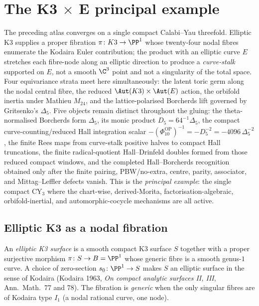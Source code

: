 \section{The K3 $\times$ E principal example}
\label{sec:gluing:k3e}
\label{gluing:part:k3xe-master}
The preceding atlas converges on a single compact
Calabi--Yau threefold. Elliptic K3 supplies a proper fibration $\pi
\colon K3 \to \PP^1$ whose twenty-four nodal fibres enumerate the
Kodaira Euler contribution; the product with an elliptic curve $E$
stretches each fibre-node along an elliptic direction to produce a
\emph{curve-stalk} supported on $E$, not a smooth $\C^3$ point and not
a singularity of the total space. Four equivariance strata meet here
simultaneously: the latent toric germ along the nodal central fibre,
the reduced $\Aut(K3)\times\Aut(E)$ action, the orbifold inertia under
Mathieu $M_{24}$, and the lattice-polarised Borcherds lift governed by
Gritsenko's $\Delta_5$. Five objects remain distinct throughout the
gluing: the theta-normalised Borcherds form \(\Delta_5\), its monic
product \(D_5=64^{-1}\Delta_5\), the compact curve-counting/reduced
Hall integration scalar
\(-(\Phi_{10}^{\mathrm{OP}})^{-1}=-D_5^{-2}=-4096\,\Delta_5^{-2}\),
the finite Rees maps from curve-stalk positive halves to compact Hall
truncations, the finite radical-quotient Hall--Drinfeld doubles formed
from those reduced compact windows, and the completed
Hall--Borcherds recognition obtained only after the finite pairing,
PBW/no-extra, centre, parity, associator, and Mittag--Leffler defects
vanish.
This is the \emph{principal example}: the single compact CY$_3$ where the
chart-wise, derived-Morita, factorisation-algebraic, orbifold-inertial,
and automorphic-cocycle mechanisms are all active.

\subsection{Elliptic K3 as a nodal fibration}
\label{gluing:sec:k3xe-elliptic-fibration}

\begin{definition}
\label{gluing:def:elliptic-K3}
An \emph{elliptic K3 surface} is a smooth compact K3 surface $S$
together with a proper surjective morphism $\pi\colon S \to B = \PP^1$
whose generic fibre is a smooth genus-$1$ curve. A choice of zero-section
$s_0 \colon \PP^1 \to S$ makes $S$ an elliptic surface in the sense of
Kodaira (Kodaira 1963, \emph{On compact analytic surfaces II, III},
Ann.\ Math.\ 77 and 78). The fibration is \emph{generic} when the only
singular fibres are of Kodaira type $I_1$ (a nodal rational curve, one
node).
\end{definition}

